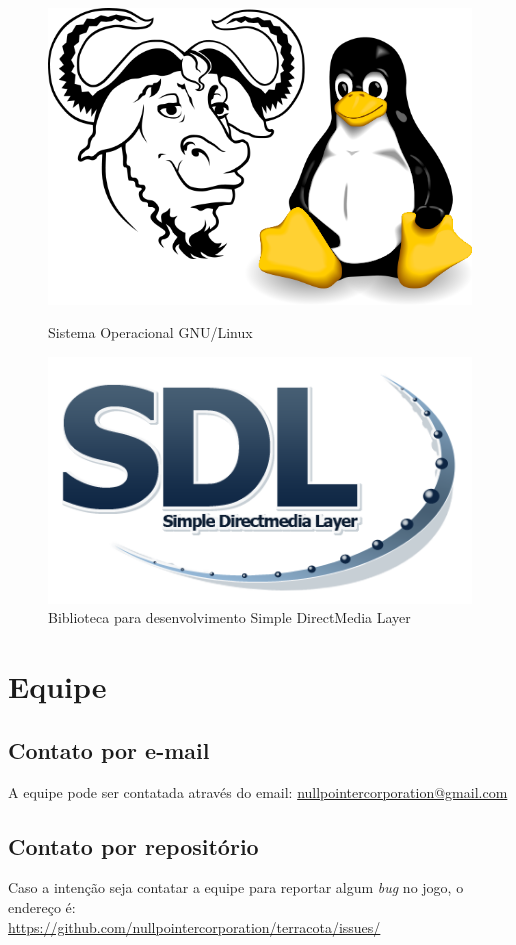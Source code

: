 \documentclass[12pt]{article}
\begin{document}
\begin{figure}[!htb]
	\centering
		\begin{minipage}{0.5\textwidth}
		\centering
		\includegraphics[scale=0.2]{logo-gnu-linux.png}
		\caption{Sistema Operacional GNU/Linux}
		\label{GNU/Linux logo}
	\end{minipage}%
	\begin{minipage}{0.5\textwidth}
		\centering
		\includegraphics[scale=0.35]{logo-sdl.png}
		\caption{Biblioteca para desenvolvimento Simple DirectMedia Layer}
		\label{SDL logo}
	\end{minipage}
\end{figure}

\section{Equipe}
\subsection{Contato por e-mail}
A equipe pode ser contatada através do email: \href{mailto:nullpointercorporation@gmail.com}
{nullpointercorporation@gmail.com}

\subsection{Contato por repositório}
Caso a intenção seja contatar a equipe para reportar algum \textit{bug} no jogo,
o endereço é:\\ \href{https://github.com/nullpointercorporation/terracota/issues/}
{https://github.com/nullpointercorporation/terracota/issues/}
\newpage
\end{document}
